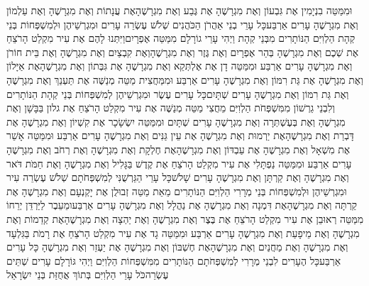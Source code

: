 \documentclass[../main/main.tex]{subfiles}
\begin{document}
\begin{multicols*}{\ncols}
וּמִמַּטֵּה בִנְיָמִין אֶת גִּבְעוֹן וְאֶת מִגְרָשֶׁהָ אֶת גֶּבַע וְאֶת מִגְרָשֶׁהָ\PreVerseSpace{}אֶת עֲנָתוֹת וְאֶת מִגְרָשֶׁהָ וְאֶת עַלְמוֹן וְאֶת מִגְרָשֶׁהָ עָרִים אַרְבַּע\PreVerseSpace{}כָּל עָרֵי בְנֵי אַהֲרֹן הַכֹּהֲנִים שְׁלֹשׁ עֶשְׂרֵה עָרִים וּמִגְרְשֵׁיהֶן \ClosedSection{}וּלְמִשְׁפְּחוֹת בְּנֵי קְהָת הַלְוִיִּם הַנּוֹתָרִים מִבְּנֵי קְהָת וַיְהִי עָרֵי גוֹרָלָם מִמַּטֵּה אֶפְרָיִם\PreVerseSpace{}וַיִּתְּנוּ לָהֶם אֶת עִיר מִקְלַט הָרֹצֵחַ אֶת שְׁכֶם וְאֶת מִגְרָשֶׁהָ בְּהַר אֶפְרָיִם וְאֶת גֶּזֶר וְאֶת מִגְרָשֶׁהָ\PreVerseSpace{}וְאֶת קִבְצַיִם וְאֶת מִגְרָשֶׁהָ וְאֶת בֵּית חוֹרֹן וְאֶת מִגְרָשֶׁהָ עָרִים אַרְבַּע \ClosedSection{}וּמִמַּטֵּה דָן אֶת אֶלְתְּקֵא וְאֶת מִגְרָשֶׁהָ אֶת גִּבְּתוֹן וְאֶת מִגְרָשֶׁהָ\PreVerseSpace{}אֶת אַיָּלוֹן וְאֶת מִגְרָשֶׁהָ אֶת גַּת רִמּוֹן וְאֶת מִגְרָשֶׁהָ עָרִים אַרְבַּע \ClosedSection{}וּמִמַּחֲצִית מַטֵּה מְנַשֶּׁה אֶת תַּעְנַךְ וְאֶת מִגְרָשֶׁהָ וְאֶת גַּת רִמּוֹן וְאֶת מִגְרָשֶׁהָ עָרִים שְׁתָּיִם\PreVerseSpace{}כָּל עָרִים עֶשֶׂר וּמִגְרְשֵׁיהֶן לְמִשְׁפְּחוֹת בְּנֵי קְהָת הַנּוֹתָרִים \ClosedSection{}וְלִבְנֵי גֵרְשׁוֹן מִמִּשְׁפְּחֹת הַלְוִיִּם מֵחֲצִי מַטֵּה מְנַשֶּׁה אֶת עִיר מִקְלַט הָרֹצֵחַ אֶת גלון בַּבָּשָׁן וְאֶת מִגְרָשֶׁהָ וְאֶת בְּעֶשְׁתְּרָה וְאֶת מִגְרָשֶׁהָ עָרִים שְׁתָּיִם \ClosedSection{}וּמִמַּטֵּה יִשְׂשָׂכָר אֶת קִשְׁיוֹן וְאֶת מִגְרָשֶׁהָ אֶת דָּבְרַת וְאֶת מִגְרָשֶׁהָ\PreVerseSpace{}אֶת יַרְמוּת וְאֶת מִגְרָשֶׁהָ אֶת עֵין גַּנִּים וְאֶת מִגְרָשֶׁהָ עָרִים אַרְבַּע \ClosedSection{}וּמִמַּטֵּה אָשֵׁר אֶת מִשְׁאָל וְאֶת מִגְרָשֶׁהָ אֶת עַבְדּוֹן וְאֶת מִגְרָשֶׁהָ\PreVerseSpace{}אֶת חֶלְקָת וְאֶת מִגְרָשֶׁהָ וְאֶת רְחֹב וְאֶת מִגְרָשֶׁהָ עָרִים אַרְבַּע \ClosedSection{}וּמִמַּטֵּה נַפְתָּלִי אֶת עִיר מִקְלַט הָרֹצֵחַ אֶת קֶדֶשׁ בַּגָּלִיל וְאֶת מִגְרָשֶׁהָ וְאֶת חַמֹּת דֹּאר וְאֶת מִגְרָשֶׁהָ וְאֶת קַרְתָּן וְאֶת מִגְרָשֶׁהָ עָרִים שָׁלֹשׁ\PreVerseSpace{}כָּל עָרֵי הַגֵּרְשֻׁנִּי לְמִשְׁפְּחֹתָם שְׁלֹשׁ עֶשְׂרֵה עִיר וּמִגְרְשֵׁיהֶן \ClosedSection{}וּלְמִשְׁפְּחוֹת בְּנֵי מְרָרִי הַלְוִיִּם הַנּוֹתָרִים מֵאֵת מַטֵּה זְבוּלֻן אֶת יָקְנְעָם וְאֶת מִגְרָשֶׁהָ אֶת קַרְתָּה וְאֶת מִגְרָשֶׁהָ\PreVerseSpace{}אֶת דִּמְנָה וְאֶת מִגְרָשֶׁהָ אֶת נַהֲלָל וְאֶת מִגְרָשֶׁהָ עָרִים אַרְבַּע\PreVerseSpace{}ומֵעֵבֶר לַיַּרְדֵּן יְרֵחוֹ מִמַּטֵּה רְאוּבֵן אֶת עִיר מִקְלַט הָרֹצֵחַ\SubEnd{} אֶת בֶּצֶר וְאֶת מִגְרָשֶׁהָ וְאֶת יַהְצָה וְאֶת מִגְרָשֶׁהָ\PreVerseSpace{}אֶת קְדֵמוֹת וְאֶת מִגְרָשֶׁהָ וְאֶת מֵיפָעַת וְאֶת מִגְרָשֶׁהָ עָרִים אַרְבַּע \ClosedSection{}וּמִמַּטֵּה גָד אֶת עִיר מִקְלַט הָרֹצֵחַ אֶת רָמֹת בַּגִּלְעָד וְאֶת מִגְרָשֶׁהָ וְאֶת מַחֲנַיִם וְאֶת מִגְרָשֶׁהָ\PreVerseSpace{}אֶת חֶשְׁבּוֹן וְאֶת מִגְרָשֶׁהָ אֶת יַעְזֵר וְאֶת מִגְרָשֶׁהָ כָּל עָרִים אַרְבַּע\PreVerseSpace{}כָּל הֶעָרִים לִבְנֵי מְרָרִי לְמִשְׁפְּחֹתָם הַנּוֹתָרִים מִמִּשְׁפְּחוֹת הַלְוִיִּם וַיְהִי גּוֹרָלָם עָרִים שְׁתֵּים עֶשְׂרֵה\PreVerseSpace{}כֹּל עָרֵי הַלְוִיִּם בְּתוֹךְ אֲחֻזַּת בְּנֵי יִשְׂרָאֵל 
\end{multicols*}
\end{document}
